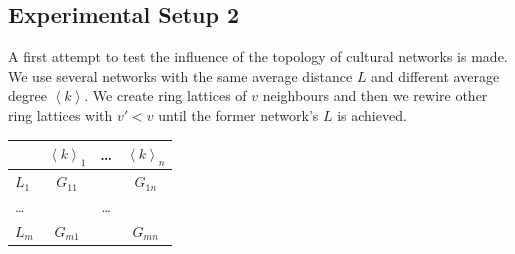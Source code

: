 \documentclass[a1paper,portrait,showframe,fontscale=.45]{baposter}
\begin{document}
\begin{poster}
{\begin{multicols}{2}
		    \subsection*{Experimental Setup 2}
			A first attempt to test the influence of the topology of cultural networks is made. We use several networks with the same average distance $L$ and different average degree $\left\langle k\right\rangle$. We create ring lattices of $v$ neighbours and then we rewire other ring lattices with $v'<v$ until the former network's $L$ is achieved.
		    \begin{center}
			\begin{tabular}{l|ccc}
			    & $\left\langle k\right\rangle_1$	 	& \dots & $\left\langle k\right\rangle_n$		\\\hline
			    $L_1$	& $G_{11}$	& 	& $G_{1n}$	\\	
			    \dots	&		&\dots	&		\\
			    $L_m$	& $G_{m1}$	& 	& $G_{mn}$	\\	
			\end{tabular}
		    \end{center}


\end{multicols}}
\end{poster}
\end{document}
